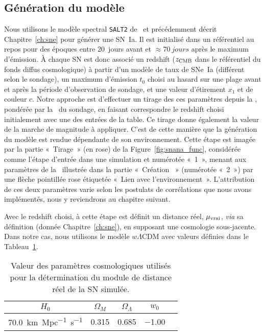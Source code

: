 \documentclass[../main/main.tex]{subfiles}
\begin{document}
\subsection{Génération du modèle}\label{ssec:simsn}

Nous utilisons le modèle spectral \texttt{SALT2} de~\cite{guy2007} et
précédemment décrit Chapitre~\ref{ch:sne} pour générer une SN~Ia. Il est
initialisé dans un référentiel au repos pour des époques entre \SI{20}{jours}
avant et $\approx\SI{70}{jours}$ après le maximum d'émission. À chaque SN est
donc associé un redshift ($z_{\rm CMB}$ dans le référentiel du fonds diffus
cosmologique) à partir d'un modèle de taux de SNe~Ia (différent selon le
sondage), un maximum d'émission $t_0$ choisi au hasard sur une plage avant et
après la période d'observation de sondage, et une valeur d'étirement $x_1$ et de
couleur $c$. Notre approche est d'effectuer un tirage des ces paramètres depuis
la \hostlib, pondérée par la \wgtmap\ du sondage, en faisant correspondre le
redshift choisi initialement avec une des entrées de la table. Ce tirage donne
également la valeur de la marche de magnitude à appliquer. C'est de cette
manière que la génération du modèle est rendue dépendante de son environnement.
Cette étape est imagée par la partie «~Tirage~» (en rose) de la
Figure~\ref{fig:snana_func}, considérée comme l'étape d'entrée dans une
simulation et numérotée «~1~», menant aux paramètres de la \hostlib\ illustrée
dans la partie «~Création \hostlib~» (numérotée «~2~») par une flèche pointillée
rose étiquetée «~Lien avec l'environnement~». L'attribution de ces deux
paramètres varie selon les postulats de corrélations que nous avons implémentés,
nous y reviendrons au chapitre suivant.

Avec le redshift choisi, à cette étape est définit un distance réel, $\mu_{\rm
vrai}$, \textit{via} sa définition (donnée Chapitre~\ref{ch:sne}), en supposant
une cosmologie sous-jacente. Dans notre cas, nous utilisons le modèle
$w\Lambda$CDM avec valeurs définies dans le Tableau~\ref{tab:cosmoinput}.

\begin{table}[ht]
    \centering
    \caption[Valeur des paramètres cosmologiques utilisés pour la détermination
    du module de distance réel de la SN simulée]{Valeur des paramètres
        cosmologiques utilisés pour la détermination du module de distance réel
    de la SN simulée.}
    \label{tab:cosmoinput}
    \begin{tabular}{ccccc}
        \toprule
        $H_0$ & $\Omega_M$ & $\Omega_\Lambda$ & $w_0$ \\
        \midrule
        \SI{70.0}{km.Mpc^{-1}.s^{-1}} & \num{0.315} & \num{0.685} & \num{-1.00}\\ 
        \bottomrule
    \end{tabular}
\end{table}
\end{document}
